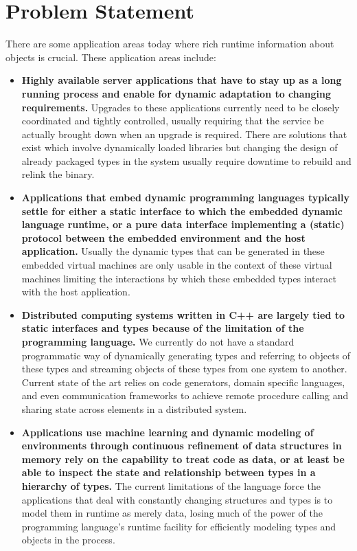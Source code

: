 \section{Problem Statement}

There are some application areas today where rich runtime information about
objects is crucial.  These application areas include:

\begin{itemize}

  \item \textbf{Highly available server applications that have to stay up as a
  long running process and enable for dynamic adaptation to changing
  requirements.} Upgrades to these applications currently need to be closely
  coordinated and tightly controlled, usually requiring that the service be
  actually brought down when an upgrade is required. There are solutions that
  exist which involve dynamically loaded libraries but changing the design of
  already packaged types in the system usually require downtime to rebuild and
  relink the binary.

  \item \textbf{Applications that embed dynamic programming languages
  typically settle for either a static interface to which the embedded dynamic
  language runtime, or a pure data interface implementing a (static) protocol
  between the embedded environment and the host application.} Usually the
  dynamic types that can be generated in these embedded virtual machines are
  only usable in the context of these virtual machines limiting the
  interactions by which these embedded types interact with the host
  application.

  \item \textbf{Distributed computing systems written in C++ are largely tied
  to static interfaces and types because of the limitation of the programming
  language.} We currently do not have a standard programmatic way of
  dynamically generating types and referring to objects of these types and
  streaming objects of these types from one system to another. Current state
  of the art relies on code generators, domain specific languages, and even
  communication frameworks to achieve remote procedure calling and sharing
  state across elements in a distributed system.

  \item \textbf{Applications use machine learning and dynamic modeling of
  environments through continuous refinement of data structures in memory rely
  on the capability to treat code as data, or at least be able to inspect the
  state and relationship between types in a hierarchy of types.} The current
  limitations of the language force the applications that deal with constantly
  changing structures and types is to model them in runtime as merely data,
  losing much of the power of the programming language’s runtime facility for
  efficiently modeling types and objects in the process.


\end{itemize}
